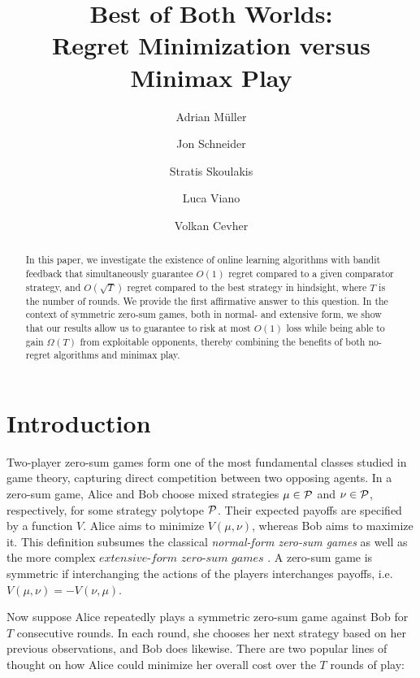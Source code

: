 \documentclass[11pt]{article}
\title{\bf \Large Best of Both Worlds:\\Regret Minimization versus Minimax Play}
\author[*,1]{\normalsize Adrian Müller}
\author[*,2]{Jon Schneider}
\author[*,3]{Stratis Skoulakis}
\author[*,4]{Luca Viano}
\author[4]{Volkan Cevher}
\affil[1]{ETH Zürich}
\affil[2]{Google Research}
\affil[3]{Aarhus University}
\affil[4]{EPFL}
\date{}
\begin{document}
\maketitle

\begin{abstract}
    \noindent In this paper, we investigate the existence of online learning algorithms with bandit feedback that simultaneously guarantee $O(1)$ regret compared to a given comparator strategy, and $O(\sqrt{T})$ regret compared to the best strategy in hindsight, where $T$ is the number of rounds. We provide the first affirmative answer to this question. In the context of symmetric zero-sum games, both in normal- and extensive form, we show that our results allow us to guarantee to risk at most $O(1)$ loss while being able to gain $\Omega(T)$ from exploitable opponents, thereby combining the benefits of both no-regret algorithms and minimax play.
\end{abstract}


{\def\thefootnote{*}} 

\setlength\parindent{0pt}

\section{Introduction} \label{sec:intro}

Two-player zero-sum games form one of the most fundamental classes studied in game theory, capturing direct competition between two opposing agents. In a zero-sum game, Alice and Bob choose mixed strategies $\mu \in \mathcal{P}$ and $\nu\in\mathcal{P}$, respectively, for some strategy polytope $\mathcal{P}$. Their expected payoffs are specified by a function $V$. Alice aims to minimize $V(\mu,\nu)$, whereas Bob aims to maximize it. This definition subsumes the classical \emph{normal-form zero-sum games} \citep[e.g., Rock-Paper-Scissors]{von2007theory} as well as the more complex $\textit{extensive-form zero-sum games}$ \citep[e.g., Heads-up Poker]{osborne1994course}. A zero-sum game is symmetric if interchanging the actions of the players interchanges payoffs, i.e. $V(\mu,\nu) = -V(\nu,\mu)$.

Now suppose Alice repeatedly plays a symmetric zero-sum game against Bob for $T$ consecutive rounds. In each round, she chooses her next strategy based on her previous observations, and Bob does likewise. There are two popular lines of thought on how Alice could minimize her overall cost over the $T$ rounds of play:
\end{document}
